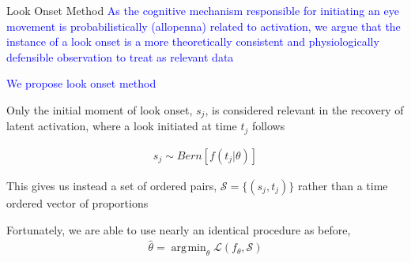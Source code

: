 \documentclass{beamer}
\DeclareMathOperator*{\argmin}{arg\!\min}
\newcommand{\vp}{\vspace{2mm}}
\providecommand{\cn}[1]{\textcolor{blue}{#1}}
\begin{document}
\begin{frame}{Look Onset Method}
\cn{As the cognitive mechanism responsible for initiating an eye movement is probabilistically (allopenna) related to activation, we argue that the instance of a look onset is a more theoretically consistent and physiologically defensible observation to treat as relevant data} \vp

\cn{We propose look onset method}

Only the initial moment of look onset, $s_j$, is considered relevant in the recovery of latent activation, where a look initiated at time $t_j$ follows
\vspace{-2mm}

\begin{align*}
s_j \sim Bern \left[f(t_j | \theta)\right]
\end{align*}

This gives us instead a set of ordered pairs, $\mathcal{S} = \{(s_j, t_j)\}$ rather than a time ordered vector of proportions \\ \vp

Fortunately, we are able to use nearly an identical procedure as before, 
\begin{align*}
\hat{\theta} = \argmin_{\theta} \mathcal{L}(f_{\theta}, \mathcal{S})
\end{align*}

\end{frame}

%
%
%
%
\end{document}
